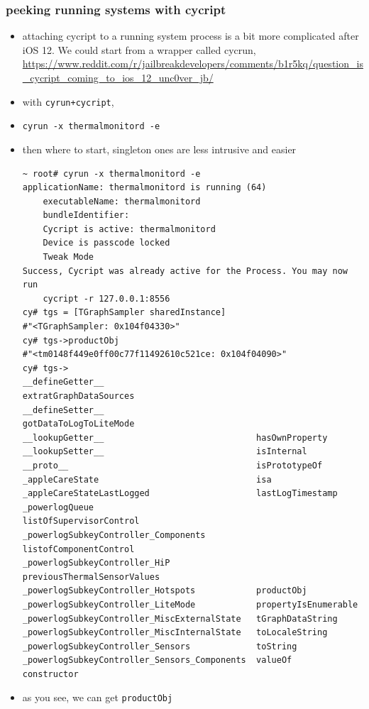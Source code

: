 \documentclass{beamer}
\begin{document}
\begin{frame}
  \frametitle{peeking running systems with cycript}
  \begin{itemize}
  \item attaching cycript to a running system process is a bit more complicated after iOS 12. We could start from a wrapper called cycrun, \url{https://www.reddit.com/r/jailbreakdevelopers/comments/b1r5kq/question\_is\_cycript\_coming\_to\_ios\_12\_unc0ver\_jb/}
  \item with \texttt{cyrun+cycript},
  \item \texttt{cyrun -x thermalmonitord -e}
  \item then where to start, singleton ones are less intrusive and easier
\tiny
\begin{lstlisting}[basicstyle=\tiny,frame=single,label='cyrun']
~ root# cyrun -x thermalmonitord -e 
applicationName: thermalmonitord is running (64)
    executableName: thermalmonitord
    bundleIdentifier: 
    Cycript is active: thermalmonitord
    Device is passcode locked
    Tweak Mode
Success, Cycript was already active for the Process. You may now run
    cycript -r 127.0.0.1:8556
cy# tgs = [TGraphSampler sharedInstance]
#"<TGraphSampler: 0x104f04330>"
cy# tgs->productObj 
#"<tm0148f449e0ff00c77f11492610c521ce: 0x104f04090>"
cy# tgs->
__defineGetter__                              extratGraphDataSources
__defineSetter__                              gotDataToLogToLiteMode
__lookupGetter__                              hasOwnProperty
__lookupSetter__                              isInternal
__proto__                                     isPrototypeOf
_appleCareState                               isa
_appleCareStateLastLogged                     lastLogTimestamp
_powerlogQueue                                listOfSupervisorControl
_powerlogSubkeyController_Components          listofComponentControl
_powerlogSubkeyController_HiP                 previousThermalSensorValues
_powerlogSubkeyController_Hotspots            productObj
_powerlogSubkeyController_LiteMode            propertyIsEnumerable
_powerlogSubkeyController_MiscExternalState   tGraphDataString
_powerlogSubkeyController_MiscInternalState   toLocaleString
_powerlogSubkeyController_Sensors             toString
_powerlogSubkeyController_Sensors_Components  valueOf
constructor
\end{lstlisting}
\normalsize
    \item as you see, we can get \texttt{productObj}
      \tiny
      \begin{lstlisting}[basicstyle=\tiny,frame=single,label=cycript-hidsensors]

\end{lstlisting}
\end{itemize}
\end{frame}
\end{document}
